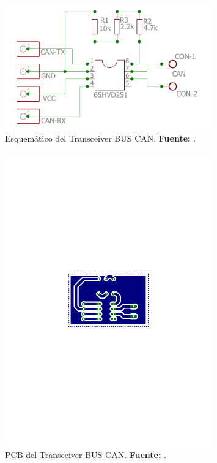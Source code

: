 \begin{figure}[H]
	\centering
		\includegraphics[width=0.8\textwidth]{./Cap4imagen/transSchem.pdf}
	\caption[Esquemático del Transceiver BUS CAN.]{Esquemático del Transceiver BUS CAN.\textbf{ Fuente:} \cite{DaP}.}
	\label{Esch4} %
\end{figure}




\begin{figure}[H]
	\centering
		\includegraphics[trim = 5mm 60mm 5mm 60mm, clip, width=0.8\textwidth]{./Cap4imagen/transPcb3.pdf}
	\caption[PCB del Transceiver BUS CAN.]{PCB del Transceiver BUS CAN.\textbf{ Fuente:} \cite{DaP}.}
	\label{Esch7} %
\end{figure}

